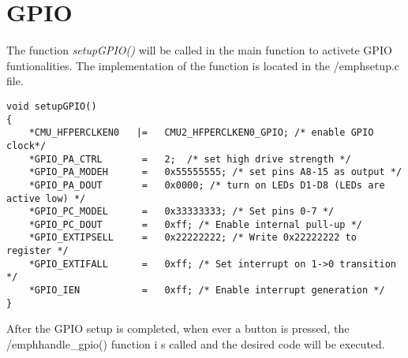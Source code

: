 \section{GPIO}
The function \emph{setupGPIO()} will be called in the main function to activete GPIO funtionalities.
The implementation of the function is located in the /emph{setup.c} file.

\begin{verbatim}
void setupGPIO()
{
    *CMU_HFPERCLKEN0   |=   CMU2_HFPERCLKEN0_GPIO; /* enable GPIO clock*/
    *GPIO_PA_CTRL       =   2;  /* set high drive strength */
    *GPIO_PA_MODEH      =   0x55555555; /* set pins A8-15 as output */
    *GPIO_PA_DOUT       =   0x0000; /* turn on LEDs D1-D8 (LEDs are active low) */
    *GPIO_PC_MODEL      =   0x33333333; /* Set pins 0-7 */
    *GPIO_PC_DOUT       =   0xff; /* Enable internal pull-up */
    *GPIO_EXTIPSELL     =   0x22222222; /* Write 0x22222222 to register */
    *GPIO_EXTIFALL      =   0xff; /* Set interrupt on 1->0 transition */
    *GPIO_IEN           =   0xff; /* Enable interrupt generation */
}
\end{verbatim}

After the GPIO setup is completed, when ever a button is pressed, the /emph{handle_gpio()} function i s called and the desired code will be executed.
